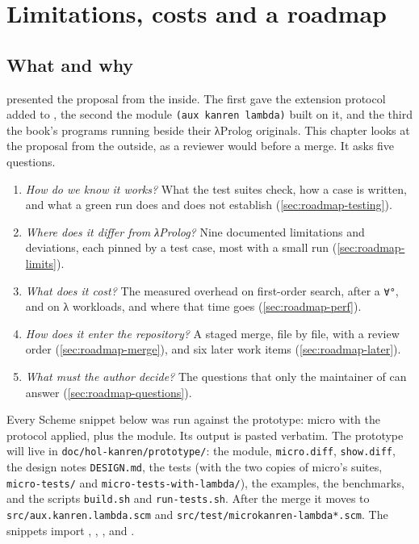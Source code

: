 \chapter{Limitations, costs and a roadmap}\label{ch:roadmap}

\section*{What and why}

 presented the proposal from the inside. The first gave the
extension protocol added to \micro, the second the module \texttt{(aux kanren lambda)} built on it, and
the third the book's programs running beside their λProlog originals. This chapter looks at the proposal
from the outside, as a reviewer would before a merge. It asks five questions.
\begin{enumerate}
  \item \emph{How do we know it works?} What the test suites check, how a case is written, and what a
    green run does and does not establish (\cref{sec:roadmap-testing}).
  \item \emph{Where does it differ from λProlog?} Nine documented limitations and deviations, each
    pinned by a test case, most with a small run (\cref{sec:roadmap-limits}).
  \item \emph{What does it cost?} The measured overhead on first-order search, after a \texttt{∀°},
    and on λ workloads, and where that time goes (\cref{sec:roadmap-perf}).
  \item \emph{How does it enter the repository?} A staged merge, file by file, with a review order
    (\cref{sec:roadmap-merge}), and six later work items (\cref{sec:roadmap-later}).
  \item \emph{What must the author decide?} The questions that only the maintainer of \aux{} can
    answer (\cref{sec:roadmap-questions}).
\end{enumerate}

Every Scheme snippet below was run against the prototype: micro with the protocol applied, plus the
module. Its output is pasted verbatim. The prototype will live in \texttt{doc/hol-kanren/prototype/}:
the module, \texttt{micro.diff}, \texttt{show.diff}, the design notes \texttt{DESIGN.md}, the tests (with
the two copies of micro's suites, \texttt{micro-tests/} and \texttt{micro-tests-with-lambda/}), the
examples, the benchmarks, and the scripts \texttt{build.sh} and \texttt{run-tests.sh}. After
the merge it moves to \texttt{src/aux.kanren.lambda.scm} and \texttt{src/test/microkanren-lambda*.scm}.
The snippets import , , \micro,  and
.%


